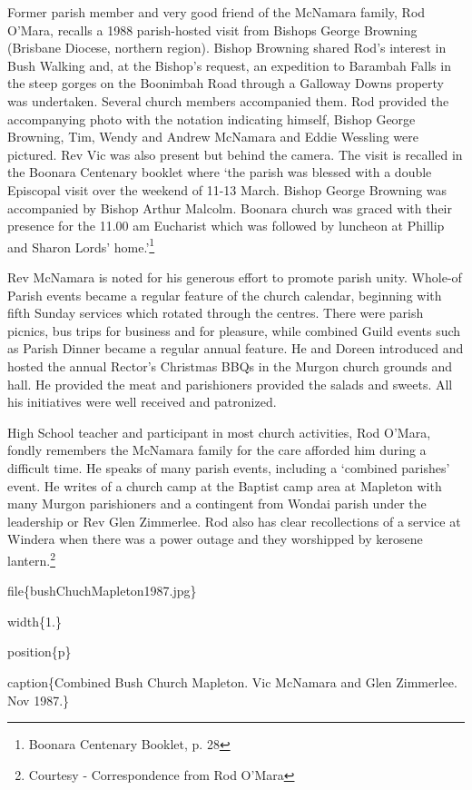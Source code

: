 Former parish member and very good friend of the McNamara family, Rod O'Mara, recalls a 1988 parish-hosted visit from Bishops George Browning (Brisbane Diocese, northern region). Bishop Browning shared Rod's interest in Bush Walking and, at the Bishop's request, an expedition to Barambah Falls in the steep gorges on the Boonimbah Road through a Galloway Downs property was undertaken. Several church members accompanied them. Rod provided the accompanying photo with the notation indicating himself, Bishop George Browning, Tim, Wendy and Andrew McNamara and Eddie Wessling were pictured. Rev Vic was also present but behind the camera. The visit is recalled in the Boonara Centenary booklet where `the parish was blessed with a double Episcopal visit over the weekend of 11-13 March. Bishop George Browning was accompanied by Bishop Arthur Malcolm. Boonara church was graced with their presence for the 11.00 am Eucharist which was followed by luncheon at Phillip and Sharon Lords' home.'\footnote{Boonara Centenary Booklet, p. 28}

Rev McNamara is noted for his generous effort to promote parish unity. Whole-of Parish events became a regular feature of the church calendar, beginning with fifth Sunday services which rotated through the centres. There were parish picnics, bus trips for business and for pleasure, while combined Guild events such as Parish Dinner became a regular annual feature. He and Doreen introduced and hosted the annual Rector's Christmas BBQs in the Murgon church grounds and hall. He provided the meat and parishioners provided the salads and sweets. All his initiatives were well received and patronized.

High School teacher and participant in most church activities, Rod O'Mara, fondly remembers the McNamara family for the care afforded him during a difficult time. He speaks of many parish events, including a `combined parishes' event. He writes of a church camp at the Baptist camp area at Mapleton with many Murgon parishioners and a contingent from Wondai parish under the leadership or Rev Glen Zimmerlee. Rod also has clear recollections of a service at Windera when there was a power outage and they worshipped by kerosene lantern.\footnote{Courtesy - Correspondence from Rod O'Mara}

file\{bushChuchMapleton1987.jpg\}

width\{1.\}

position\{p\}

caption\{Combined Bush Church Mapleton. Vic McNamara and Glen Zimmerlee. Nov 1987.\}

